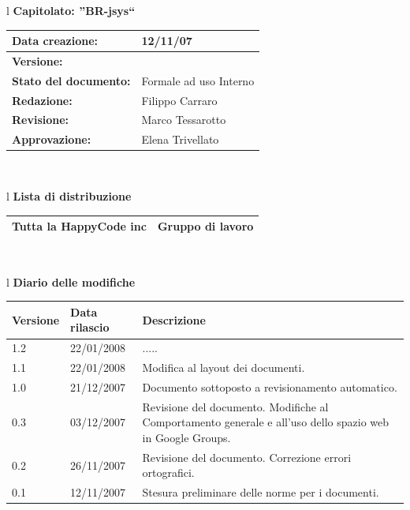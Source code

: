 \documentclass[11pt,titlepage,a4paper]{report}
\begin{document}
\begin{center}
\thispagestyle{plain}
\begin{table}[htbp]
\large{
\begin{tabular}{l}
\Large{\textbf{\textsf{Capitolato: ''BR-jsys``}}} \\
\begin{tabular}{||p{6cm}||p{6cm}||}
\hline
\textbf{Data creazione:} & 12/11/07 \\
\hline
\textbf{Versione:} & \lv \\ \hline
\textbf{Stato del documento:} & Formale ad uso Interno \\ \hline
\textbf{Redazione:} & Filippo Carraro \\ \hline
\textbf{Revisione:} & Marco Tessarotto \\ \hline
\textbf{Approvazione:}  & Elena Trivellato\\ \hline
\end{tabular} \\
\end{tabular}
}
\end{table}

\begin{table}[hbtp]
\large{
\begin{tabular}{l}
\Large{\textbf{\textsf{Lista di distribuzione}}} \\
\begin{tabular}{||p{6cm}||p{6cm}||} \hline
{Tutta la HappyCode inc}& Gruppo di lavoro \\ \hline
\end{tabular} \\
\end{tabular}
}
\end{table}

\begin{table}[hbtp]
\large{
\begin{tabular}{l}
\Large{\textbf{\textsf{Diario delle modifiche}}} \\
\begin{tabular}{||p{2cm}||p{3.5cm}||p{6cm}||}
\hline
\textbf{Versione} & \textbf{Data rilascio} & \textbf{Descrizione} \\ \hline
1.2 & 22/01/2008 & .....\\ \hline
1.1 & 22/01/2008 & Modifica al layout dei documenti.\\ \hline
1.0 & 21/12/2007 & Documento sottoposto a revisionamento automatico.\\ \hline
0.3 & 03/12/2007 & Revisione del documento. Modifiche al Comportamento generale e all'uso dello spazio web in Google Groups. \\ \hline
0.2 & 26/11/2007 & Revisione del documento. Correzione errori ortografici. \\ \hline
0.1 & 12/11/2007 & Stesura preliminare delle norme per i documenti. \\ \hline
\end{tabular} \\
\end{tabular}

}
\end{table}
\end{center}
\end{document}
